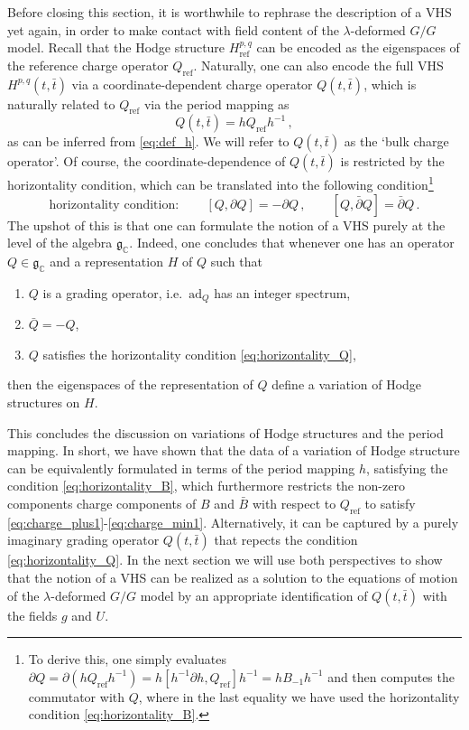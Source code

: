 \documentclass[11pt,a4paper]{article}
\numberwithin{equation}{section}
\numberwithin{table}{section}\setlength{\multlinegap}{25pt}
\begin{document}
Before closing this section, it is worthwhile to rephrase the description of a VHS yet again, in order to make contact with field content of the $\lambda$-deformed $G/G$ model. Recall that the Hodge structure $H^{p,q}_{\mathrm{ref}}$ can be encoded as the eigenspaces of the reference charge operator $Q_{\mathrm{ref}}$. Naturally, one can also encode the full VHS $H^{p,q}(t,\bar{t})$ via a coordinate-dependent charge operator $Q(t,\bar{t})$, which is naturally related to $Q_{\mathrm{ref}}$ via the period mapping as
\begin{equation}
	Q(t,\bar{t}) = h Q_{\mathrm{ref}} h^{-1}\,,
\end{equation}
as can be inferred from \eqref{eq:def_h}. We will refer to $Q(t,\bar{t})$ as the `bulk charge operator'. Of course, the coordinate-dependence of $Q(t,\bar{t})$ is restricted by the horizontality condition, which can be translated into the following condition\footnote{To derive this, one simply evaluates $\partial Q = \partial(h Q_{\mathrm{ref}}h^{-1}) = h[h^{-1}\partial h, Q_{\mathrm{ref}}]h^{-1}=h B_{-1} h^{-1}$ and then computes the commutator with $Q$, where in the last equality we have used the horizontality condition \eqref{eq:horizontality_B}.}
\begin{equation}\label{eq:horizontality_Q}
	\text{horizontality condition}:\qquad [Q,\partial Q] = -\partial Q\,,\qquad [Q,\bar{\partial}Q] = \bar{\partial}Q\,.
\end{equation}
The upshot of this is that one can formulate the notion of a VHS purely at the level of the algebra $\mathfrak{g}_{\mathbb{C}}$. Indeed, one concludes that whenever one has an operator $Q\in\mathfrak{g}_{\mathbb{C}}$ and a representation $H$ of $Q$ such that
\begin{enumerate}
	\item $Q$ is a grading operator, i.e.~$\mathrm{ad}_Q$ has an integer spectrum,
	\item $\bar{Q}=-Q$,
	\item $Q$ satisfies the horizontality condition \eqref{eq:horizontality_Q},
\end{enumerate}
then the eigenspaces of the representation of $Q$ define a variation of Hodge structures on $H$.

This concludes the discussion on variations of Hodge structures and the period mapping. In short, we have shown that the data of a variation of Hodge structure can be equivalently formulated in terms of the period mapping $h$, satisfying the condition \eqref{eq:horizontality_B}, which furthermore restricts the non-zero components charge components of $B$ and $\bar{B}$ with respect to $Q_{\mathrm{ref}}$ to satisfy \eqref{eq:charge_plus1}-\eqref{eq:charge_min1}. Alternatively, it can be captured by a purely imaginary grading operator $Q(t,\bar{t})$ that repects the condition \eqref{eq:horizontality_Q}. In the next section we will use both perspectives to show that the notion of a VHS can be realized as a solution to the equations of motion of the $\lambda$-deformed $G/G$ model by an appropriate identification of $Q(t,\bar{t})$ with the fields $g$ and $U$.
\end{document}
